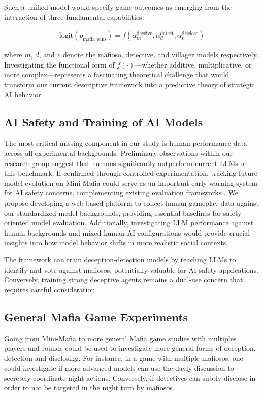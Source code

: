 \documentclass{article}
\begin{document}
Such a unified model would specify game outcomes as emerging from the interaction of three fundamental capabilities:

\begin{align}
\text{logit}(p_{\text{mafia wins}}) = f(\alpha_m^{\text{deceive}}, \alpha_d^{\text{detect}}, \alpha_v^{\text{disclose}})
\end{align}

where $m$, $d$, and $v$ denote the mafioso, detective, and villager models respectively. Investigating the functional form of $f(\cdot)$—whether additive, multiplicative, or more complex—represents a fascinating theoretical challenge that would transform our current descriptive framework into a predictive theory of strategic AI behavior.

\subsection{AI Safety and Training of AI Models}

The most critical missing component in our study is human performance data across all experimental backgrounds. Preliminary observations within our research group suggest that humans significantly outperform current LLMs on this benchmark. If confirmed through controlled experimentation, tracking future model evolution on Mini-Mafia could serve as an important early warning system for AI safety concerns, complementing existing evaluation frameworks \citep{sennott2023machiavelli, mao2023alympics}. We propose developing a web-based platform to collect human gameplay data against our standardized model backgrounds, providing essential baselines for safety-oriented model evaluation. Additionally, investigating LLM performance against human backgrounds and mixed human-AI configurations would provide crucial insights into how model behavior shifts in more realistic social contexts.



The framework can train deception-detection models by teaching LLMs to identify and vote against mafiosos, potentially valuable for AI safety applications. Conversely, training strong deceptive agents remains a dual-use concern that requires careful consideration.

\subsection{General Mafia Game Experiments}

Going from Mini-Mafia to more general Mafia game studies with multiples players and rounds could be used to investigate more general forms of deception, detection and disclosing. For instance, in a game with multiple mafiosos, one could investigate if more advanced models can use the dayly discussion to secretely coordinate night actions. Conversely, if detectives can subtly disclose in order to not be targeted in the night turn by mafiosos. 
\end{document}
